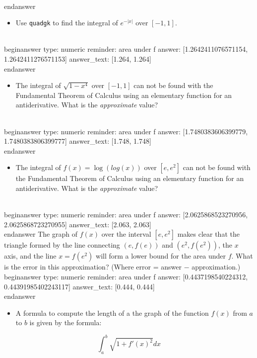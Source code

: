 \documentclass[12pt]{article}
\begin{document}
\\end{answer}
\begin{itemize}\item Use \texttt{quadgk} to find the integral of $e^{-|x|}$ over $[-1,1]$.\end{itemize}
\\begin{answer}
    type: numeric
    reminder: area under f
    answer: [1.2642411076571154, 1.2642411276571153]
    answer_text: [1.264, 1.264] 
\\end{answer}
\begin{itemize}\item The integral of $\sqrt{1-x^4}$ over $[-1,1]$ can not be found with the Fundamental Theorem of Calculus using an elementary function for an antiderivative. What is the \textit{approximate} value?\end{itemize}
\\begin{answer}
    type: numeric
    reminder: area under f
    answer: [1.7480383606399779, 1.7480383806399777]
    answer_text: [1.748, 1.748] 
\\end{answer}
\begin{itemize}\item The integral of $f(x) = \log(log(x))$ over $[e,e^2]$ can not be   found with the Fundamental Theorem of Calculus using an elementary   function for an antiderivative. What is the \textit{approximate} value?\end{itemize}
\\begin{answer}
    type: numeric
    reminder: area under f
    answer: [2.0625868523270956, 2.0625868723270955]
    answer_text: [2.063, 2.063] 
\\end{answer}
\newline
The graph of $f(x)$ over the interval $[e, e^2]$ makes clear that the triangle formed by the line connecting $(e, f(e))$ and $(e^2, f(e^2))$, the $x$ axis, and the line $x=f(e^2)$ will form a lower bound for the area under $f$. What is the error in this approximation? (Where error = answer $-$ approximation.)
\\begin{answer}
    type: numeric
    reminder: area under f
    answer: [0.4437198540224312, 0.44391985402243117]
    answer_text: [0.444, 0.444] 
\\end{answer}
\begin{itemize}\item A formula to compute the length of a the graph of the function $f(x)$ from $a$ to $b$ is given by the formula:\end{itemize}
$$
\int_a^b \sqrt{1 + f'(x)^2} dx
$$
\end{document}
